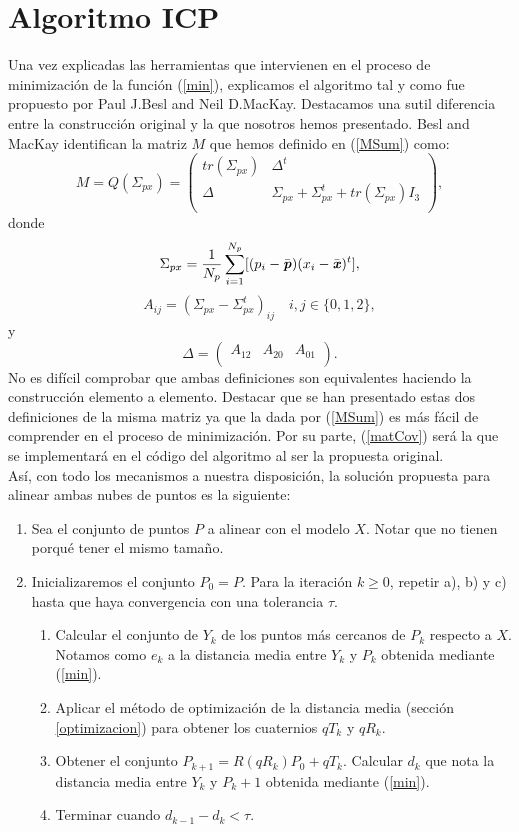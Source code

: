 \section{Algoritmo ICP}\label{algICP}
Una vez explicadas las herramientas que intervienen en el proceso de minimización de la función (\ref{min}), explicamos el algoritmo tal y como fue propuesto por Paul J.Besl and Neil D.MacKay. Destacamos una sutil diferencia entre la construcción original y la que nosotros hemos presentado. Besl and MacKay identifican la matriz $ M $ que hemos definido en (\ref{MSum}) como:
\begin{equation}\label{matCov}
M = Q(\Sigma_{px}) =
 \begin{pmatrix}
tr(\Sigma_{px}) & \Delta^t \\
\Delta & \Sigma_{px} + \Sigma_{px}^t + tr(\Sigma_{px})I_3\\
\end{pmatrix}, 
\end{equation}
donde 
\[
\Sigma_{px} = \frac{1}{N_p}\sum_{i=1}^{N_p} \lbrack (p_i-\bar{\textbf{\emph{p}}})(x_i - \bar{\textbf{\emph{x}}})^t\rbrack, \]
\[A_{ij} = (\Sigma_{px}-\Sigma_{px}^t)_{ij} \quad i,j \in \lbrace 0,1,2 \rbrace,\]
y 
\[\Delta = \begin{pmatrix}
A_{12} & A_{20} & A_{01}  \\
\end{pmatrix}. \]
No es difícil comprobar que ambas definiciones son equivalentes haciendo la construcción elemento a elemento. Destacar que se han presentado estas dos definiciones de la misma matriz ya que la dada por (\ref{MSum}) es más fácil de comprender en el proceso de minimización. Por su parte, (\ref{matCov}) será la que se implementará en el código del algoritmo al ser la propuesta original. \\

Así, con todo los mecanismos a nuestra disposición, la solución propuesta para alinear ambas nubes de puntos es la siguiente:
\begin{enumerate}
\item Sea el conjunto de puntos $ P $ a alinear con el modelo $ X $. Notar que no tienen porqué tener el mismo tamaño.
\item Inicializaremos el conjunto $ P_0 = P $. Para la iteración $ k \geq 0$, repetir a), b) y c) hasta que haya convergencia con una tolerancia $ \tau $.
\begin{enumerate}
	\item Calcular el conjunto de $ Y_k  $ de los puntos más cercanos de $ P_k $ respecto a $ X $. Notamos como $ e_{k} $ a la distancia media entre $ Y_k  $ y $ P_k  $ obtenida mediante (\ref{min}).
	\item Aplicar el método de optimización de la distancia media (sección \ref{optimizacion}) para obtener los cuaternios $ qT_{k} $ y $ qR_{k} $. 
	\item Obtener el conjunto $ P_{k+1} = R(qR_{k})P_0 + qT_{k} $. Calcular $ d_k $ que nota la distancia media entre $ Y_k  $ y $ P_k+1  $ obtenida mediante (\ref{min}).
	\item Terminar cuando $ d_{k-1} - d_k < \tau $.
\end{enumerate}
\end{enumerate}


